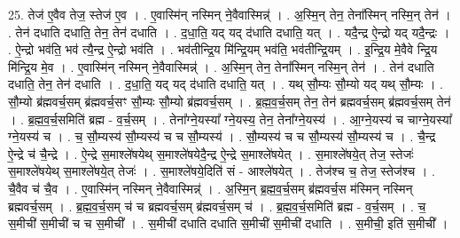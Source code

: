 \documentclass[17pt]{extarticle}
\begin{document}
25. तेज॑ ए॒वैव तेज॒ स्तेज॑ ए॒व । . ए॒वास्मि॑न् नस्मिन् ने॒वैवास्मिन्न्॑ । . अ॒स्मि॒न् तेन॒ तेना᳚स्मिन् नस्मि॒न् तेन॑ । . तेन॑ दधाति दधाति॒ तेन॒ तेन॑ दधाति । . द॒धा॒ति॒ यद् यद् द॑धाति दधाति॒ यत् । . यदै॒न्द्र ऐ॒न्द्रो यद् यदै॒न्द्रः । . ऐ॒न्द्रो भव॑ति॒ भव॑ त्यै॒न्द्र ऐ॒न्द्रो भव॑ति । . भव॑तीन्द्रि॒य मि॑न्द्रि॒यम् भव॑ति॒ भव॑तीन्द्रि॒यम् । . इ॒न्द्रि॒य मे॒वैवे न्द्रि॒य मि॑न्द्रि॒य मे॒व । . ए॒वास्मि॑न् नस्मिन् ने॒वैवास्मिन्न्॑ । . अ॒स्मि॒न् तेन॒ तेना᳚स्मिन् नस्मि॒न् तेन॑ । . तेन॑ दधाति दधाति॒ तेन॒ तेन॑ दधाति । . द॒धा॒ति॒ यद् यद् द॑धाति दधाति॒ यत् । . यथ् सौ॒म्यः सौ॒म्यो यद् यथ् सौ॒म्यः । . सौ॒म्यो ब्र॑ह्मवर्च॒सम् ब्र॑ह्मवर्च॒सꣳ सौ॒म्यः सौ॒म्यो ब्र॑ह्मवर्च॒सम् । . ब्र॒ह्म॒व॒र्च॒सम् तेन॒ तेन॑ ब्रह्मवर्च॒सम् ब्र॑ह्मवर्च॒सम् तेन॑ । . ब्र॒ह्म॒व॒र्च॒समिति॑ ब्रह्म - व॒र्च॒सम् । . तेना᳚ग्ने॒यस्या᳚ ग्ने॒यस्य॒ तेन॒ तेना᳚ग्ने॒यस्य॑ । . आ॒ग्ने॒यस्य॑ च चाग्ने॒यस्या᳚ ग्ने॒यस्य॑ च । . च॒ सौ॒म्यस्य॑ सौ॒म्यस्य॑ च च सौ॒म्यस्य॑ । . सौ॒म्यस्य॑ च च सौ॒म्यस्य॑ सौ॒म्यस्य॑ च । . चै॒न्द्र ऐ॒न्द्रे च॑ चै॒न्द्रे । . ऐ॒न्द्रे स॒माश्ले॑षयेथ् स॒माश्ले॑षयेदै॒न्द्र ऐ॒न्द्रे स॒माश्ले॑षयेत् । . स॒माश्ले॑षये॒त् तेज॒ स्तेजः॑ स॒माश्ले॑षयेथ् स॒माश्ले॑षये॒त् तेजः॑ । . स॒माश्ले॑षये॒दिति॑ सं - आश्ले॑षयेत् । . तेज॑श्च च॒ तेज॒ स्तेज॑श्च । . चै॒वैव च॑ चै॒व । . ए॒वास्मि॑न् नस्मिन् ने॒वैवास्मिन्न्॑ । . अ॒स्मि॒न् ब्र॒ह्म॒व॒र्च॒सम् ब्र॑ह्मवर्च॒स म॑स्मिन् नस्मिन् ब्रह्मवर्च॒सम् । . ब्र॒ह्म॒व॒र्च॒सम् च॑ च ब्रह्मवर्च॒सम् ब्र॑ह्मवर्च॒सम् च॑ । . ब्र॒ह्म॒व॒र्च॒समिति॑ ब्रह्म - व॒र्च॒सम् । . च॒ स॒मीची॑ स॒मीची॑ च च स॒मीची᳚ । . स॒मीची॑ दधाति दधाति स॒मीची॑ स॒मीची॑ दधाति । . स॒मीची॒ इति॑ स॒मीची᳚ । \newline
\end{document}
